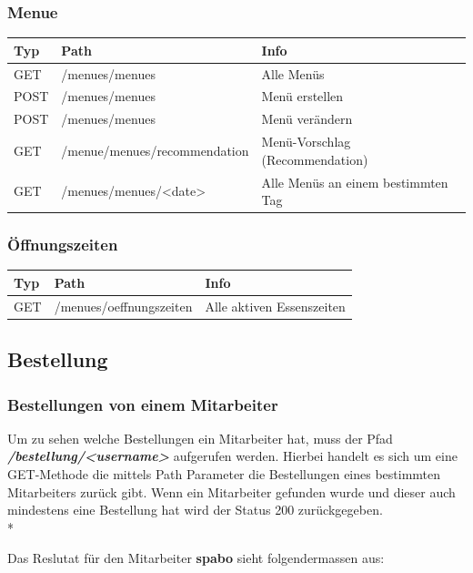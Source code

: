 \subsubsection{Menue}

\begin{tabular}{|p{3cm}|p{6cm}|p{5cm}|}
    \hline
    Typ & Path & Info \\
    \hline
    GET & /menues/menues & Alle Menüs\\
    \hline
    POST & /menues/menues & Menü erstellen\\
    \hline
    POST & /menues/menues & Menü verändern\\
    \hline
    GET & /menue/menues/recommendation & Menü-Vorschlag (Recommendation)\\
    \hline
    GET & /menues/menues/<date> & Alle Menüs an einem bestimmten Tag\\
    \hline
\end{tabular}

\subsubsection{Öffnungszeiten}

\begin{tabular}{|p{3cm}|p{6cm}|p{5cm}|}
    \hline
    Typ & Path & Info\\
    \hline
    GET & /menues/oeffnungszeiten & Alle aktiven Essenszeiten\\
    \hline
\end{tabular}

\subsection{Bestellung}

\subsubsection{Bestellungen von einem Mitarbeiter}

Um zu sehen welche Bestellungen ein Mitarbeiter hat, muss der Pfad \textbf{\textit{/bestellung/<username>}} aufgerufen werden. 
Hierbei handelt es sich um eine GET-Methode die mittels Path Parameter die Bestellungen eines bestimmten Mitarbeiters zurück gibt.
Wenn ein Mitarbeiter gefunden wurde und dieser auch mindestens eine Bestellung hat wird der Status 200 zurückgegeben. \\*

Das Reslutat für den Mitarbeiter \textbf{spabo} sieht folgendermassen aus:


